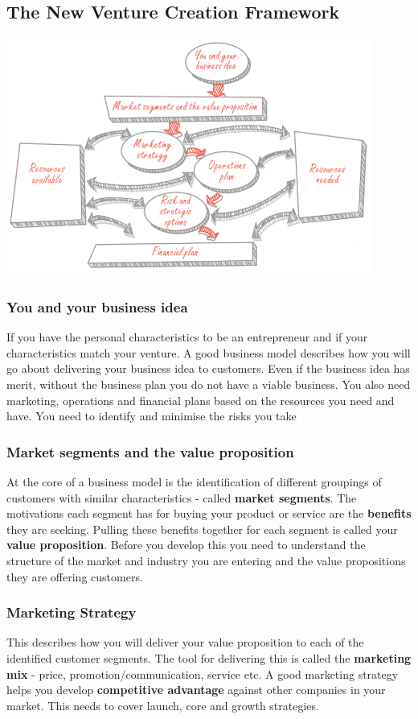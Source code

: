 \documentclass{article}[18pt]
\begin{document}
\subsection{The New Venture Creation Framework}
\begin{center}
\includegraphics[width=12cm]{nvc.png}
\end{center}
\subsubsection{You and your business idea}
If you have the personal characteristics to be an entrepreneur and if your characteristics match your venture. A good business model describes how you will go about delivering your business idea to customers. Even if the business idea has merit, without the business plan you do not have a viable business. You also need marketing, operations and financial plans based on the resources you need and have. You need to identify and minimise the risks you take
\subsubsection{Market segments and the value proposition}
At the core of a business model is the identification of different groupings of customers with similar characteristics - called \textbf{market segments}. The motivations each segment has for buying your product or service are the \textbf{benefits} they are seeking. Pulling these benefits together for each segment is called your \textbf{value proposition}. Before you develop this you need to understand the structure of the market and industry you are entering and the value propositions they are offering customers.
\subsubsection{Marketing Strategy}
This describes how you will deliver your value proposition to each of the identified customer segments. The tool for delivering this is called the \textbf{marketing mix} - price, promotion/communication, service etc. A good marketing strategy helps you develop \textbf{competitive advantage} against other companies in your market. This needs to cover launch, core and growth strategies.
\end{document}
